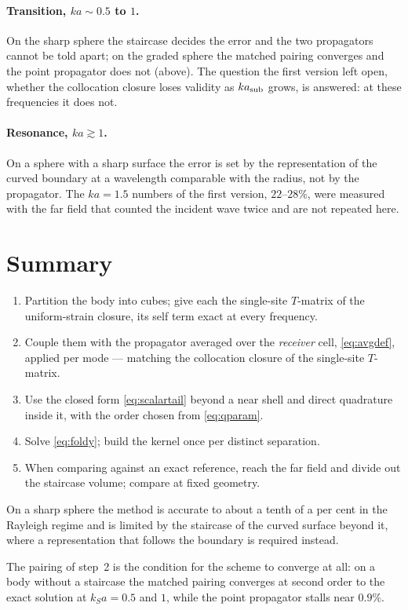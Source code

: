 \documentclass[11pt,a4paper]{article}
\begin{document}
\paragraph{Transition, $ka\sim0.5$ to $1$.}  On the sharp sphere the staircase
decides the error and the two propagators cannot be told apart; on the graded
sphere the matched pairing converges and the point propagator does not
(above).  The question the first version left open, whether the collocation
closure loses validity as $ka_{\rm sub}$ grows, is answered: at these
frequencies it does not.

\paragraph{Resonance, $ka\gtrsim1$.}  On a sphere with a sharp surface the error
is set by the representation of the curved boundary at a wavelength comparable
with the radius, not by the propagator.  The $ka = 1.5$ numbers of the first
version, $22$--$28\%$, were measured with the far field that counted the
incident wave twice and are not repeated here.

\section{Summary}

\begin{enumerate}
\item Partition the body into cubes; give each the single-site $T$-matrix of
      the uniform-strain closure, its self term exact at every frequency.
\item Couple them with the propagator averaged over the \emph{receiver} cell,
      \eqref{eq:avgdef}, applied per mode --- matching the collocation closure
      of the single-site $T$-matrix.
\item Use the closed form \eqref{eq:scalartail} beyond a near shell and direct
      quadrature inside it, with the order chosen from \eqref{eq:qparam}.
\item Solve \eqref{eq:foldy}; build the kernel once per distinct separation.
\item When comparing against an exact reference, reach the far field and
      divide out the staircase volume; compare at fixed geometry.
\end{enumerate}

\noindent
On a sharp sphere the method is accurate to about a tenth of a per cent in the
Rayleigh regime and is limited by the staircase of the curved surface beyond
it, where a representation that follows the boundary is required instead.

\noindent
The pairing of step~2 is the condition for the scheme to converge at all: on a
body without a staircase the matched pairing converges at second order to the
exact solution at $k_Sa = 0.5$ and $1$, while the point propagator stalls near
$0.9\%$.
\end{document}
